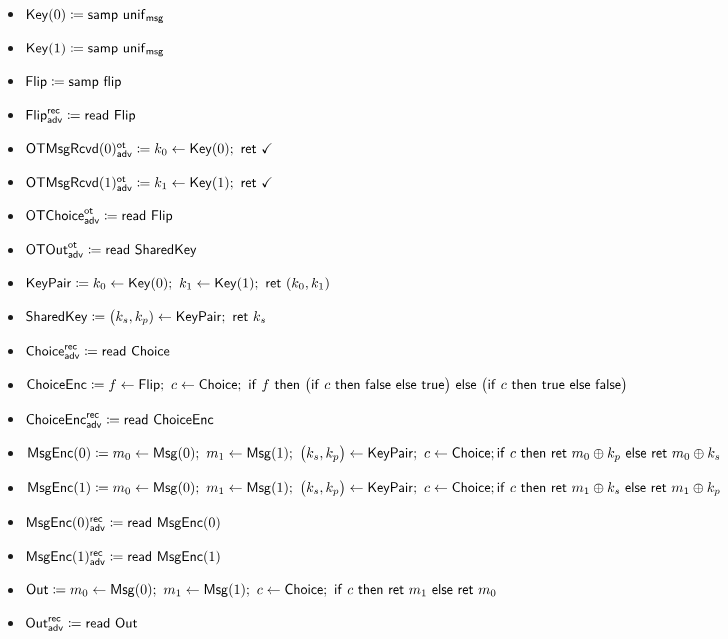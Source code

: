 \begin{itemize}
\item {\color{red} $\mathsf{Key}(0) \coloneqq \mathsf{samp} \ \mathsf{unif}_{\mathsf{msg}}$}
\item {\color{red} $\mathsf{Key}(1) \coloneqq \mathsf{samp} \ \mathsf{unif}_{\mathsf{msg}}$}
\item $\mathsf{Flip} \coloneqq \mathsf{samp} \ \mathsf{flip}$
\item {\color{blue} $\mathsf{Flip}^{\mathsf{rec}}_{\mathsf{adv}} \coloneqq \mathsf{read} \ \mathsf{Flip}$}
\item {\color{blue} $\LeakOTMsgRcvd(0)^\ot_\adv \coloneqq k_0 \leftarrow \Key(0); \ \ret{\checkmark}$}
\item {\color{blue} $\LeakOTMsgRcvd(1)^\ot_\adv \coloneqq k_1 \leftarrow \Key(1); \ \ret{\checkmark}$}
\item {\color{blue} $\mathsf{OTChoice}^{\mathsf{ot}}_{\mathsf{adv}} \coloneqq \mathsf{read} \ \mathsf{Flip}$}
\item {\color{blue} $\mathsf{OTOut}^{\mathsf{ot}}_{\mathsf{adv}} \coloneqq \mathsf{read} \ \mathsf{SharedKey}$}
\item {\color{red} $\KeyPair \coloneqq k_0 \leftarrow \Key(0); \ k_1 \leftarrow \Key(1); \ \ret{(k_0,k_1)}$}
\item $\mathsf{SharedKey} \coloneqq \big(k_s,k_p) \leftarrow \mathsf{KeyPair}; \ \mathsf{ret} \ k_s$
\item {\color{blue} $\mathsf{Choice}^{\mathsf{rec}}_{\mathsf{adv}} \coloneqq \mathsf{read} \ \mathsf{Choice}$}
\item $\ChoiceEnc \coloneqq f \leftarrow \Flip; \ c \leftarrow \Choice; \ \ifte{f}{\big(\ifte{c}{\false}{\true}\big)}{\big(\ifte{c}{\true}{\false}\big)}$
\item {\color{blue} $\mathsf{ChoiceEnc}^{\mathsf{rec}}_{\mathsf{adv}} \coloneqq \mathsf{read} \ \mathsf{ChoiceEnc}$}
\item $\mathsf{MsgEnc}(0) \coloneqq m_0 \leftarrow \mathsf{Msg}(0); \ m_1 \leftarrow \mathsf{Msg}(1); \ \big(k_s,k_p\big) \leftarrow \mathsf{KeyPair}; \ c \leftarrow \mathsf{Choice}; \\ \mathsf{if} \ c \ \mathsf{then} \ \mathsf{ret} \ m_0 \oplus k_p \ \mathsf{else} \ \mathsf{ret} \ m_0 \oplus k_s$
\item $\mathsf{MsgEnc}(1) \coloneqq m_0 \leftarrow \mathsf{Msg}(0); \ m_1 \leftarrow \mathsf{Msg}(1); \ \big(k_s,k_p\big) \leftarrow \mathsf{KeyPair}; \ c \leftarrow \mathsf{Choice}; \\ \mathsf{if} \ c \ \mathsf{then} \ \mathsf{ret} \ m_1 \oplus k_s \ \mathsf{else} \ \mathsf{ret} \ m_1 \oplus k_p$
\item {\color{blue} $\mathsf{MsgEnc}(0)^{\mathsf{rec}}_{\mathsf{adv}} \coloneqq \mathsf{read} \ \mathsf{MsgEnc}(0)$}
\item {\color{blue} $\mathsf{MsgEnc}(1)^{\mathsf{rec}}_{\mathsf{adv}} \coloneqq \mathsf{read} \ \mathsf{MsgEnc}(1)$}
\item $\Out \coloneqq m_0 \leftarrow \Msg(0); \ m_1 \leftarrow \Msg(1); \ c \leftarrow \Choice; \ \ifte{c}{\ret{m_1}}{\ret{m_0}}$
\item {\color{blue} $\mathsf{Out}^{\mathsf{rec}}_{\mathsf{adv}} \coloneqq \mathsf{read} \ \mathsf{Out}$}
\end{itemize}

